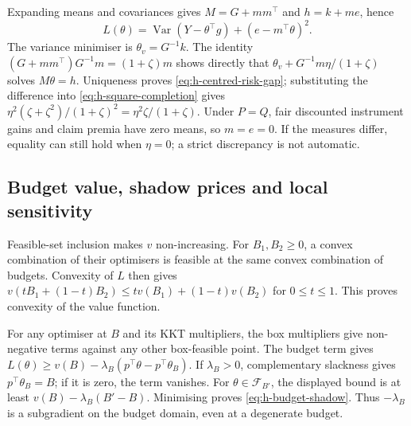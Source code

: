 \documentclass[11pt]{article}
\begin{document}
Expanding means and covariances gives $M=G+mm^\top$ and
$h=k+me$, hence
\begin{equation}
 L(\theta)=\operatorname{Var}(Y-\theta^\top g)
 +(e-m^\top\theta)^2.
 \label{eq:h-mean-variance-decomposition}
\end{equation}
The variance minimiser is $\theta_v=G^{-1}k$. The identity
$(G+mm^\top)G^{-1}m=(1+\zeta)m$ shows directly that
$\theta_v+G^{-1}m\eta/(1+\zeta)$ solves $M\theta=h$.
Uniqueness proves \eqref{eq:h-centred-risk-gap}; substituting the
difference into \eqref{eq:h-square-completion} gives
$\eta^2(\zeta+\zeta^2)/(1+\zeta)^2=\eta^2\zeta/(1+\zeta)$.
Under $P=Q$, fair discounted instrument gains and claim premia have
zero means, so $m=e=0$. If the measures differ, equality can still
hold when $\eta=0$; a strict discrepancy is not automatic.

\subsection{Budget value, shadow prices and local sensitivity}

Feasible-set inclusion makes $v$ non-increasing. For $B_1,B_2\geq0$,
a convex combination of their optimisers is feasible at the same
convex combination of budgets. Convexity of $L$ then gives
$v(tB_1+(1-t)B_2)\leq tv(B_1)+(1-t)v(B_2)$ for $0\leq t\leq1$.
This proves convexity of the value function.

For any optimiser at $B$ and its KKT multipliers, the box multipliers
give non-negative terms against any other box-feasible point.
The budget term gives
$L(\theta)\geq v(B)-\lambda_B(p^\top\theta-p^\top\theta_B)$.
If $\lambda_B>0$, complementary slackness gives $p^\top\theta_B=B$;
if it is zero, the term vanishes. For $\theta\in\mathcal F_{B'}$,
the displayed bound is at least $v(B)-\lambda_B(B'-B)$.
Minimising proves \eqref{eq:h-budget-shadow}. Thus $-\lambda_B$
is a subgradient on the budget domain, even at a degenerate budget.
\end{document}
